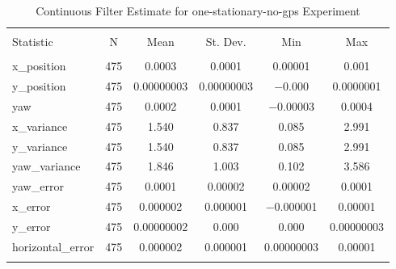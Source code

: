 
\begin{table}[h] \centering 
  \caption{Continuous Filter Estimate for one-stationary-no-gps Experiment} 
  \label{tab:one_stationary_no_gps_continuous_summary} 
\begin{tabular}{@{\extracolsep{5pt}}lccccc} 
\\[-1.8ex]\hline 
\hline \\[-1.8ex] 
Statistic & \multicolumn{1}{c}{N} & \multicolumn{1}{c}{Mean} & \multicolumn{1}{c}{St. Dev.} & \multicolumn{1}{c}{Min} & \multicolumn{1}{c}{Max} \\ 
\hline \\[-1.8ex] 
x\_position & 475 & \num{0.0003} & \num{0.0001} & \num{0.00001} & \num{0.001} \\ 
y\_position & 475 & \num{0.00000003} & \num{0.00000003} & $-$0.000 & \num{0.0000001} \\ 
yaw & 475 & \num{0.0002} & \num{0.0001} & $-$0.00003 & \num{0.0004} \\ 
x\_variance & 475 & \num{1.540} & \num{0.837} & \num{0.085} & \num{2.991} \\ 
y\_variance & 475 & \num{1.540} & \num{0.837} & \num{0.085} & \num{2.991} \\ 
yaw\_variance & 475 & \num{1.846} & \num{1.003} & \num{0.102} & \num{3.586} \\ 
yaw\_error & 475 & \num{0.0001} & \num{0.00002} & \num{0.00002} & \num{0.0001} \\ 
x\_error & 475 & \num{0.000002} & \num{0.000001} & $-$0.000001 & \num{0.00001} \\ 
y\_error & 475 & \num{0.00000002} & \num{0.000} & \num{0.000} & \num{0.00000003} \\ 
horizontal\_error & 475 & \num{0.000002} & \num{0.000001} & \num{0.00000003} & \num{0.00001} \\ 
\hline \\[-1.8ex] 
\end{tabular} 
\end{table} 
